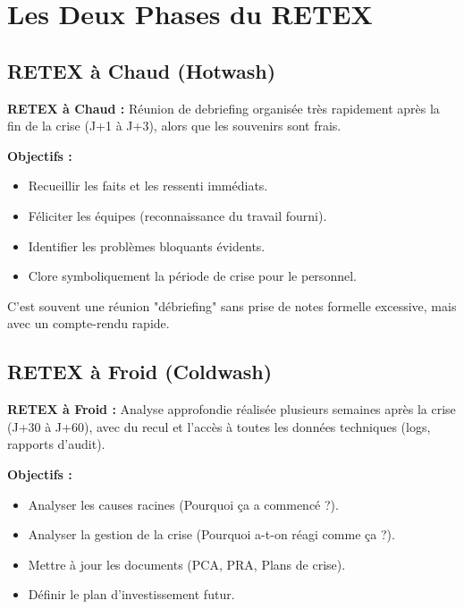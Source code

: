 \section{Les Deux Phases du RETEX}

\subsection{RETEX à Chaud (Hotwash)}

\begin{boxdef}
\textbf{RETEX à Chaud :} Réunion de debriefing organisée très rapidement après la fin de la crise (J+1 à J+3), alors que les souvenirs sont frais.
\end{boxdef}

\textbf{Objectifs :}
\begin{itemize}
    \item Recueillir les faits et les ressenti immédiats.
    \item Féliciter les équipes (reconnaissance du travail fourni).
    \item Identifier les problèmes bloquants évidents.
    \item Clore symboliquement la période de crise pour le personnel.
\end{itemize}

C'est souvent une réunion "débriefing" sans prise de notes formelle excessive, mais avec un compte-rendu rapide.

\subsection{RETEX à Froid (Coldwash)}

\begin{boxdef}
\textbf{RETEX à Froid :} Analyse approfondie réalisée plusieurs semaines après la crise (J+30 à J+60), avec du recul et l'accès à toutes les données techniques (logs, rapports d'audit).
\end{boxdef}

\textbf{Objectifs :}
\begin{itemize}
    \item Analyser les causes racines (Pourquoi ça a commencé ?).
    \item Analyser la gestion de la crise (Pourquoi a-t-on réagi comme ça ?).
    \item Mettre à jour les documents (PCA, PRA, Plans de crise).
    \item Définir le plan d'investissement futur.
\end{itemize}

